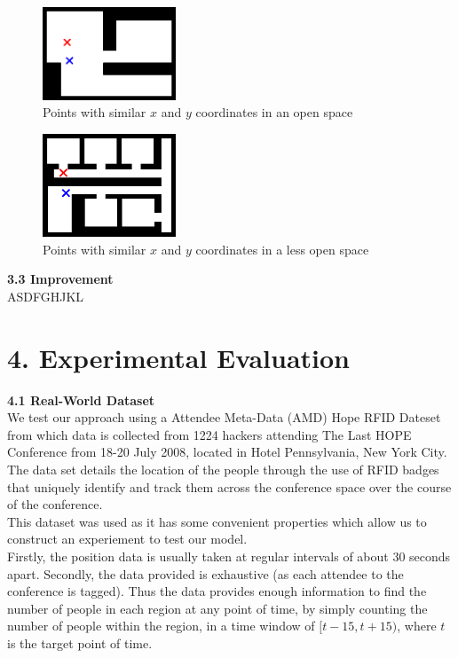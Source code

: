 \documentclass[letterpaper]{article}
\begin{document}
\begin{figure}[h!]
  \centering
    \includegraphics[width=150px,natwidth=634,natheight=442]{openspace1.png}
  \caption{Points with similar $x$ and $y$ coordinates in an open space}
  \label{fig:opspace1}
\end{figure}

\begin{figure}[h!]
  \centering
    \includegraphics[width=150px,natwidth=570,natheight=442]{openspace2.png}
  \caption{Points with similar $x$ and $y$ coordinates in a less open space}
  \label{fig:opspace2}
\end{figure}

{\bf3.3  Improvement} \\

ASDFGHJKL

\section{4.  Experimental Evaluation}

{\bf4.1  Real-World Dataset} \\

We test our approach using a Attendee Meta-Data (AMD) Hope RFID Dateset from which data is collected from 1224 hackers attending The Last HOPE Conference from 18-20 July 2008, located in Hotel Pennsylvania, New York City. The data set details the location of the people through the use of RFID badges that uniquely identify and track them across the conference space over the course of the conference. \\

This dataset was used as it has some convenient properties which allow us to construct an experiement to test our model.\\

Firstly, the position data is usually taken at regular intervals of about $30$ seconds apart. Secondly, the data provided is exhaustive (as each attendee to the conference is tagged). Thus the data provides enough information to find the number of people in each region at any point of time, by simply counting the number of people within the region, in a time window of $[t-15,t+15)$, where $t$ is the target point of time. \\
\end{document}
